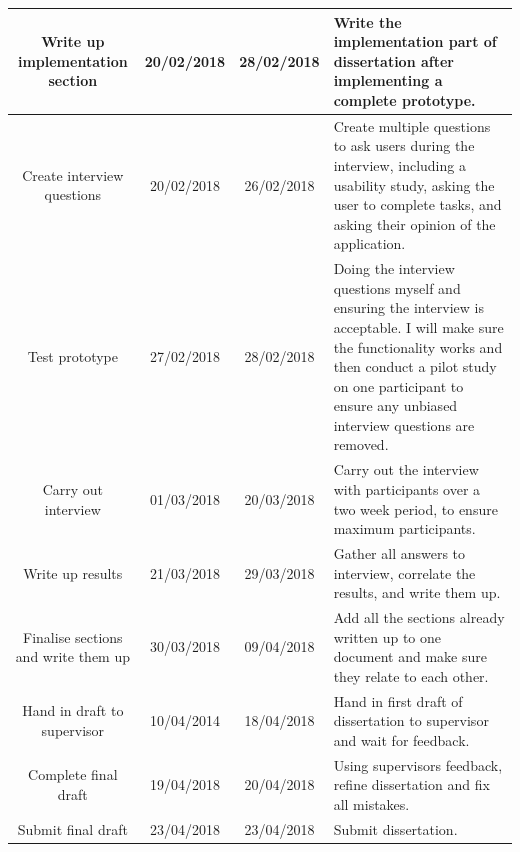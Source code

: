 \documentclass[a4paper]{report}
\begin{document}
\begin{center}
\begin{longtable} {|c|c|c|p{60mm}|}
		Write up implementation section & 20/02/2018 & 28/02/2018 & Write the implementation part of dissertation after implementing a complete prototype. \\
		\hline 
		Create interview questions & 20/02/2018 & 26/02/2018 & Create multiple questions to ask users during the interview, including a usability study, asking the user to complete tasks, and asking their opinion of the application. \\
		\hline 
		Test prototype & 27/02/2018 & 28/02/2018 & Doing the interview questions myself and ensuring the interview is acceptable. I will make sure the functionality works and then conduct a pilot study on one participant to ensure any unbiased interview questions are removed. \\
		\hline 
		Carry out interview & 01/03/2018 & 20/03/2018 & Carry out the interview with participants over a two week period, to ensure maximum participants. \\
		\hline 
		Write up results & 21/03/2018 & 29/03/2018 & Gather all answers to interview, correlate the results, and write them up. \\
		\hline
		Finalise sections and write them up & 30/03/2018 & 09/04/2018 & Add all the sections already written up to one document and make sure they relate to each other. \\
		\hline 
		Hand in draft to supervisor & 10/04/2014 & 18/04/2018 & Hand in first draft of dissertation to supervisor and wait for feedback. \\
		\hline 
		Complete final draft & 19/04/2018 & 20/04/2018 & Using supervisors feedback, refine dissertation and fix all mistakes. \\
		\hline 
		Submit final draft & 23/04/2018 & 23/04/2018 & Submit dissertation. \\
		\hline
	\end{longtable}
\end{center}
\newpage
\end{document}
